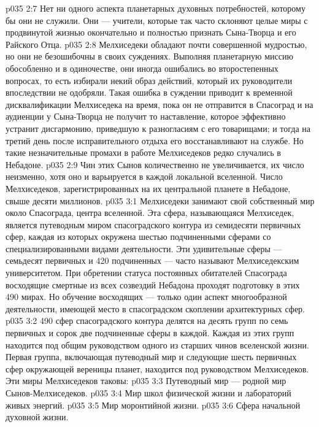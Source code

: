 \vs p035 2:7 Нет ни одного аспекта планетарных духовных потребностей, которому бы они не служили. Они --- учители, которые так часто склоняют целые миры с продвинутой жизнью окончательно и полностью признать Сына\hyp{}Творца и его Райского Отца.
\vs p035 2:8 \pc Мелхиседеки обладают почти совершенной мудростью, но они не безошибочны в своих суждениях. Выполняя планетарную миссию обособленно и в одиночестве, они иногда ошибались во второстепенных вопросах, то есть избирали некий образ действий, который их руководители впоследствии не одобряли. Такая ошибка в суждении приводит к временной дисквалификации Мелхиседека на время, пока он не отправится в Спасоград и на аудиенции у Сына\hyp{}Творца не получит то наставление, которое эффективно устранит дисгармонию, приведшую к разногласиям с его товарищами; и тогда на третий день после исправительного отдыха его восстанавливают на службе. Но такие незначительные промахи в работе Мелхиседеков редко случались в Небадоне.
\vs p035 2:9 Чин этих Сынов количественно не увеличивается, их число неизменно, хотя оно и варьируется в каждой локальной вселенной. Число Мелхиседеков, зарегистрированных на их центральной планете в Небадоне, свыше десяти миллионов.
\vs p035 3:1 Мелхиседеки занимают свой собственный мир около Спасограда, центра вселенной. Эта сфера, называющаяся Мелхиседек, является путеводным миром спасоградского контура из семидесяти первичных сфер, каждая из которых окружена шестью подчиненными сферами со специализированными видами деятельности. Эти удивительные сферы --- семьдесят первичных и 420 подчиненных --- часто называют Мелхиседекским университетом. При обретении статуса постоянных обитателей Спасограда восходящие смертные из всех созвездий Небадона проходят подготовку в этих 490 мирах. Но обучение восходящих --- только один аспект многообразной деятельности, имеющей место в спасоградском скоплении архитектурных сфер.
\vs p035 3:2 490 сфер спасоградского контура делятся на десять групп по семь первичных и сорок две подчиненные сферы в каждой. Каждая из этих групп находится под общим руководством одного из старших чинов вселенской жизни. Первая группа, включающая путеводный мир и следующие шесть первичных сфер окружающей вереницы планет, находится под руководством Мелхиседеков. Эти миры Мелхиседеков таковы:
\vs p035 3:3 \bibnobreakspace Путеводный мир --- родной мир Сынов\hyp{}Мелхиседеков.
\vs p035 3:4 \bibnobreakspace Мир школ физической жизни и лабораторий живых энергий.
\vs p035 3:5 \bibnobreakspace Мир моронтийной жизни.
\vs p035 3:6 \bibnobreakspace Сфера начальной духовной жизни.
